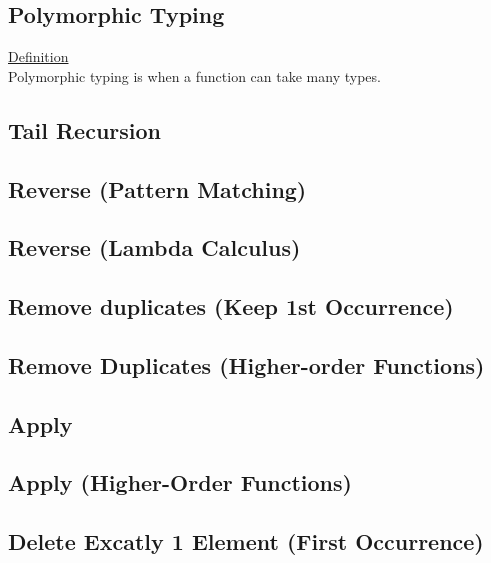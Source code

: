 \documentclass[10pt,landscape,a4paper]{article}
\begin{document}
\begin{multicols*}{5}
\subsection*{Polymorphic Typing}
\underline{Definition} \\
Polymorphic typing is when a function can take many types.

\subsection*{Tail Recursion}

\subsection*{Reverse (Pattern Matching)}

\subsection*{Reverse (Lambda Calculus)}

\subsection*{Remove duplicates (Keep 1st Occurrence)}

\subsection*{Remove Duplicates (Higher-order Functions)}

\subsection*{Apply}

\subsection*{Apply (Higher-Order Functions)}

\subsection*{Delete Excatly 1 Element (First Occurrence)}


\end{multicols*}
\end{document}
